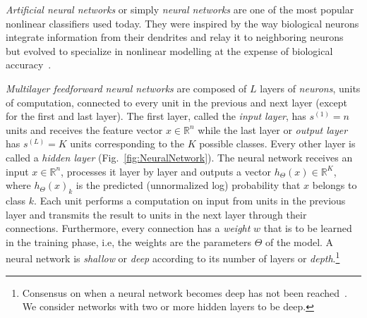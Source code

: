 \emph{Artificial neural networks} or simply \emph{neural networks} are one of the most popular nonlinear classifiers used today. They were inspired by the way biological neurons integrate information from their dendrites and relay it to neighboring neurons~\cite{McCulloch1943, Widrow1960, Rosenblatt1962} but evolved to specialize in nonlinear modelling at the expense of biological accuracy~\cite{Rumelhart1986}.%

\emph{Multilayer feedforward neural networks} are composed of $L$ layers of \emph{neurons}, units of computation,
connected to every unit in the previous and next layer (except for the first and last layer).
The first layer, called the \emph{input layer}, has $s^{(1)} = n$ units and receives the feature vector $x \in \mathbb{R}^n$ while the last layer or \emph{output layer} has $s^{(L)} = K$ units corresponding to the $K$ possible classes. Every other layer is called a \emph{hidden layer} (Fig.~\ref{fig:NeuralNetwork}). The neural network receives an input $x \in \mathbb{R}^n$, processes it layer by layer and outputs a vector $h_\Theta(x) \in \mathbb{R}^K$, where $h_\Theta(x)_k$ is the predicted (unnormalized log) probability that $x$ belongs to class $k$. Each unit performs a computation on input from units in the previous layer and transmits the result to units in the next layer through their connections. Furthermore, every connection has a \emph{weight} $w$ that is to be learned in the training phase, i.e, the weights are the parameters $\Theta$ of the model. A neural network is \emph{shallow} or \emph{deep} according to its number of layers or \emph{depth}.\footnote{Consensus on when a neural network becomes deep has not been reached~\cite{Schmidhuber2015}. We consider networks with two or more hidden layers to be deep.}

